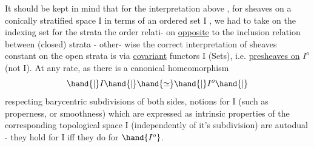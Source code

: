 It should be kept in mind that for the  interpretation above , for
sheaves on a conically stratified space \hand{$|$}I\hand{$|$} in terms of an ordered set
I , we had to take on the indexing set  for the strata the order relati-%
on \uline{opposite} to the inclusion relation between (closed) strata - other-%
wise the correct interpretation of sheaves constant on the open strata
is via \uline{covariant} functors I \hand{$\longrightarrow$} (Sets), i.e. \uline{presheaves on} $I^o$ (not I).
At any rate, as there is a canonical homeomorphism
\[ \hand{|}I\hand{|} \hand{\simeq} \hand{|}I^o\hand{|} \]
respecting  barycentric subdivisions of both sides, notions for I
(such as properness, or smoothness) which are expressed as intrinsic 
properties of the corresponding topological space \hand{$|$}I\hand{$|$} (independently of
it's subdivision) are autodual - they hold for I iff they do for $\hand{I^o}$.


